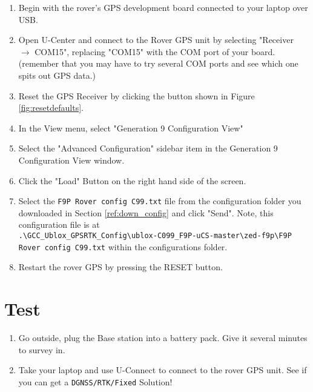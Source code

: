 \documentclass{article}%
\begin{document}
\begin{enumerate}
 
	\item Begin with the rover's GPS development board connected to your laptop over USB.
	\item Open U-Center and connect to the Rover GPS unit by selecting "Receiver $\rightarrow$ COM15", replacing "COM15" with the COM port of your board. (remember that you may have to try several COM ports and see which one spits out GPS data.)
	\item Reset the GPS Receiver by clicking the button shown in Figure \ref{fig:resetdefaults}.
	\item In the View menu, select "Generation 9 Configuration View"
	\item Select the "Advanced Configuration" sidebar item in the Generation 9 Configuration View window.
	\item Click the "Load" Button on the right hand side of the screen.
	\item Select the \texttt{F9P Rover config C99.txt} file from the configuration folder you downloaded in Section \ref{ref:down_config} and click "Send".  Note, this configuration file is at \\ \texttt{.\textbackslash GCC\_Ublox\_GPSRTK\_Config\textbackslash ublox-C099\_F9P-uCS-master\textbackslash zed-f9p\textbackslash F9P Rover config C99.txt} within the configurations folder.
	\item Restart the rover GPS by pressing the RESET button.
\end{enumerate}

\section{Test}
\begin{enumerate}
	\item Go outside, plug the Base station into a battery pack.  Give it several minutes to survey in.
	\item Take your laptop and use U-Connect to connect to the rover GPS unit.  See if you can get a \texttt{DGNSS/RTK/Fixed} Solution!
\end{enumerate}
\end{document}
